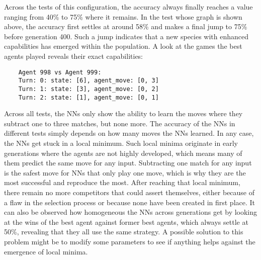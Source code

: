 Across the tests of this configuration, the accuracy always finally reaches a value ranging from 40\% to 75\% where it remains.
In the test whose graph is shown above, the accuracy first settles at around 58\% and makes a final jump to 75\% before generation 400.
Such a jump indicates that a new species with enhanced capabilities has emerged within the population.
A look at the games the best agents played reveals their exact capabilities:
\begin{verbatim}
    Agent 998 vs Agent 999:
    Turn: 0: state: [6], agent_move: [0, 3]
    Turn: 1: state: [3], agent_move: [0, 2]
    Turn: 2: state: [1], agent_move: [0, 1]
\end{verbatim}
Across all tests, the NNs only show the ability to learn the moves where they subtract one to three matches, but none more.
The accuracy of the NNs in different tests simply depends on how many moves the NNs learned.
In any case, the NNs get stuck in a local minimum.
Such local minima originate in early generations where the agents are not highly developed, which means many of them predict the same move for any input.
Subtracting one match for any input is the safest move for NNs that only play one move, which is why they are the most successful and reproduce the most.
After reaching that local minimum, there remain no more competitors that could assert themselves, either because of a flaw in the selection process or because none have been created in first place.
It can also be observed how homogeneous the NNs across generations get by looking at the wins of the best agent against former best agents, which always settle at 50\%, revealing that they all use the same strategy.
A possible solution to this problem might be to modify some parameters to see if anything helps against the emergence of local minima.

